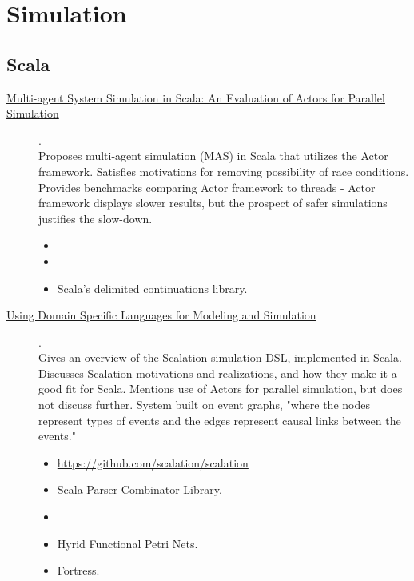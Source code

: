\chapter {Simulation}

\section{Scala}

\begin{description}
  \item[\href{https://www.researchgate.net/publication/267807039_Multi-agent_System_Simulation_in_Scala_An_Evaluation_of_Actors_for_Parallel_Simulation}{Multi-agent System Simulation in Scala: An Evaluation of Actors for Parallel Simulation}] {\cite{todd2011multi}.
    \\ Proposes multi-agent simulation (MAS) in Scala that utilizes the Actor framework. Satisfies motivations for removing possibility of race conditions. Provides benchmarks comparing Actor framework to threads - Actor framework displays slower results, but the prospect of safer simulations justifies the slow-down.
    \begin{itemize}
      \item {}
      \item {}
      \item Scala's delimited continuations library.
    \end{itemize}}
  \item[\href{https://informs-sim.org/wsc10papers/067.pdf}{Using Domain Specific Languages for Modeling and Simulation}] {\cite{miller2010using}.
    \\ Gives an overview of the Scalation simulation DSL, implemented in Scala. Discusses Scalation motivations and realizations, and how they make it a good fit for Scala. Mentions use of Actors for parallel simulation, but does not discuss further. System built on event graphs, "where the nodes represent types of events and the edges represent causal links between the events."
    \begin{itemize}
      \item \href{https://github.com/scalation/scalation}{https://github.com/scalation/scalation}
      \item Scala Parser Combinator Library.
      \item {}
      \item Hyrid Functional Petri Nets.
      \item Fortress.
    \end{itemize}}
\end{description}
